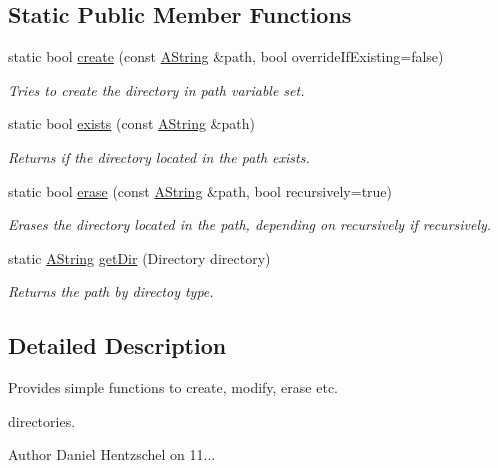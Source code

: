 \subsection*{Static Public Member Functions}
\begin{DoxyCompactItemize}
\item 
static bool \mbox{\hyperlink{class_dir_ac663fd2a33309bdb6b501439532d7477}{create}} (const \mbox{\hyperlink{class_a_string}{A\+String}} \&path, bool override\+If\+Existing=false)
\begin{DoxyCompactList}\small\item\em Tries to create the directory in path variable set. \end{DoxyCompactList}\item 
static bool \mbox{\hyperlink{class_dir_a27343faa005694b64f6c320f992d5937}{exists}} (const \mbox{\hyperlink{class_a_string}{A\+String}} \&path)
\begin{DoxyCompactList}\small\item\em Returns if the directory located in the path exists. \end{DoxyCompactList}\item 
static bool \mbox{\hyperlink{class_dir_a6bc8cdb4747c026b114f3e89b34d627f}{erase}} (const \mbox{\hyperlink{class_a_string}{A\+String}} \&path, bool recursively=true)
\begin{DoxyCompactList}\small\item\em Erases the directory located in the path, depending on recursively if recursively. \end{DoxyCompactList}\item 
static \mbox{\hyperlink{class_a_string}{A\+String}} \mbox{\hyperlink{class_dir_afa7ce6cd68c2ba64a8511d3480a198f6}{get\+Dir}} (Directory directory)
\begin{DoxyCompactList}\small\item\em Returns the path by directoy type. \end{DoxyCompactList}\end{DoxyCompactItemize}


\subsection{Detailed Description}
Provides simple functions to create, modify, erase etc. 

directories.

\begin{DoxyAuthor}{Author}
Daniel Hentzschel on 11... 
\end{DoxyAuthor}


